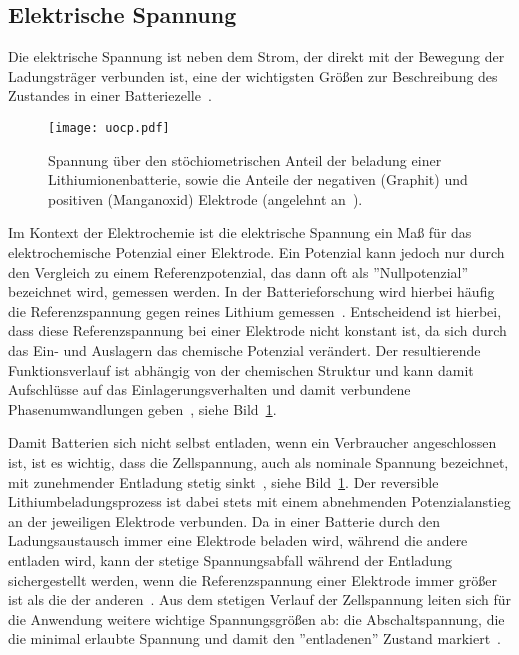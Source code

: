 

\subsection{Elektrische Spannung}

Die elektrische Spannung ist neben dem Strom, der direkt mit der Bewegung der Ladungsträger verbunden ist, eine der wichtigsten Größen zur Beschreibung des Zustandes in einer Batteriezelle~\cite{Beard2019}. 

\begin{figure}[ht]
    \center
		\texttt{[image: uocp.pdf]}
		\caption{\label{fig:battery_voltage}Spannung über den stöchiometrischen Anteil der beladung einer Lithiumionenbatterie, sowie die Anteile der negativen (Graphit) und positiven (Manganoxid) Elektrode (angelehnt an~\cite{Newman2021}).}
\end{figure}

Im Kontext der Elektrochemie ist die elektrische Spannung ein Maß für das elektrochemische Potenzial einer Elektrode. Ein Potenzial kann jedoch nur durch den Vergleich zu einem Referenzpotenzial, das dann oft als ''Nullpotenzial'' bezeichnet wird, gemessen werden. In der Batterieforschung wird hierbei häufig die Referenzspannung gegen reines Lithium gemessen~\cite{Newman2021}. Entscheidend ist hierbei, dass diese Referenzspannung bei einer Elektrode nicht konstant ist, da sich durch das Ein- und Auslagern das chemische Potenzial verändert. Der resultierende Funktionsverlauf ist abhängig von der chemischen Struktur und kann damit Aufschlüsse auf das Einlagerungsverhalten und damit verbundene Phasenumwandlungen geben~\cite{Plett2015}, siehe Bild~\ref{fig:battery_voltage}.

Damit Batterien sich nicht selbst entladen, wenn ein Verbraucher angeschlossen ist, ist es wichtig, dass die Zellspannung, auch als nominale Spannung bezeichnet, mit zunehmender Entladung stetig sinkt~\cite{Newman2021}, siehe Bild~\ref{fig:battery_voltage}. Der reversible Lithiumbeladungsprozess ist dabei stets mit einem abnehmenden Potenzialanstieg an der jeweiligen Elektrode verbunden. Da in einer Batterie durch den Ladungsaustausch immer eine Elektrode beladen wird, während die andere entladen wird, kann der stetige Spannungsabfall während der Entladung sichergestellt werden, wenn die Referenzspannung einer Elektrode immer größer ist als die der anderen~\cite{Plett2024}. Aus dem stetigen Verlauf der Zellspannung leiten sich für die Anwendung weitere wichtige Spannungsgrößen ab: die Abschaltspannung, die die minimal erlaubte Spannung und damit den ''entladenen'' Zustand markiert~\cite{Plett2015}.


